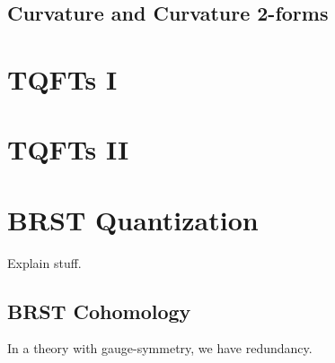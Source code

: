 \documentclass[11pt]{article}
\begin{document}
\subsection{Curvature and Curvature 2-forms}

\newpage
\section{TQFTs I}
\vskip 0.5cm


\newpage
\section{TQFTs II}
\vskip 0.5cm


\newpage
\section{BRST Quantization}
\vskip 0.5cm
Explain stuff.


\vskip 0.5cm
\subsection{BRST Cohomology}

In a theory with gauge-symmetry, we have redundancy. 


\newpage
\vskip 0.5cm
\end{document}
